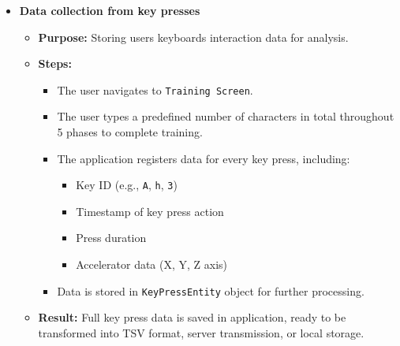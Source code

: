 \begin{itemize}
	\item \textbf{Data collection from key presses}
	\begin{itemize}
		\item \textbf{Purpose:} Storing users keyboards interaction data for analysis.
		\item \textbf{Steps:}
		\begin{itemize}
			\item The user navigates to \texttt{Training Screen}.
			\item The user types a predefined number of characters in total throughout 5 phases to complete training.
			\item The application registers data for every key press, including:
			\begin{itemize}
				\item Key ID (e.g., \texttt{A}, \texttt{h}, \texttt{3})
				\item Timestamp of key press action
				\item Press duration
				\item Accelerator data (X, Y, Z axis)
			\end{itemize}
			\item Data is stored in \texttt{KeyPressEntity} object for further processing.
		\end{itemize}
		\item \textbf{Result:} Full key press data is saved in application, ready to be transformed into TSV format, server transmission, or local storage.
	\end{itemize}
	

\end{itemize}

